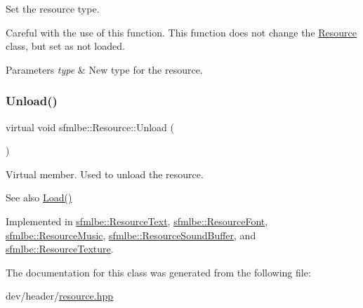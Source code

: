 Set the resource type. 

Careful with the use of this function. This function does not change the \mbox{\hyperlink{classsfmlbe_1_1_resource}{Resource}} class, but set as not loaded. 
\begin{DoxyParams}{Parameters}
{\em type} & New type for the resource. \\
\hline
\end{DoxyParams}
\mbox{\label{classsfmlbe_1_1_resource_a48c75a88679cf457965dd013f47014b9}} 
\subsubsection{\texorpdfstring{Unload()}{Unload()}}
{\footnotesize\ttfamily virtual void sfmlbe\+::\+Resource\+::\+Unload (\begin{DoxyParamCaption}{ }\end{DoxyParamCaption})\hspace{0.3cm}{\ttfamily [pure virtual]}}



Virtual member. Used to unload the resource. 

\begin{DoxySeeAlso}{See also}
\mbox{\hyperlink{classsfmlbe_1_1_resource_a35981869a1e90ebbf30258ff7aa1d6d2}{Load()}} 
\end{DoxySeeAlso}


Implemented in \mbox{\hyperlink{classsfmlbe_1_1_resource_text_a7493d044dfcd376b0fd17fd5fbd52ada}{sfmlbe\+::\+Resource\+Text}}, \mbox{\hyperlink{classsfmlbe_1_1_resource_font_a44911079325cd8fcf3f2bce64c58ff86}{sfmlbe\+::\+Resource\+Font}}, \mbox{\hyperlink{classsfmlbe_1_1_resource_music_a5697430030c12a5850f317147feb059f}{sfmlbe\+::\+Resource\+Music}}, \mbox{\hyperlink{classsfmlbe_1_1_resource_sound_buffer_aea7707b97d4451935597671c0e162a7b}{sfmlbe\+::\+Resource\+Sound\+Buffer}}, and \mbox{\hyperlink{classsfmlbe_1_1_resource_texture_ac8b1b5866242e222abf0385144711646}{sfmlbe\+::\+Resource\+Texture}}.



The documentation for this class was generated from the following file\+:\begin{DoxyCompactItemize}
\item 
dev/header/\mbox{\hyperlink{resource_8hpp}{resource.\+hpp}}\end{DoxyCompactItemize}
